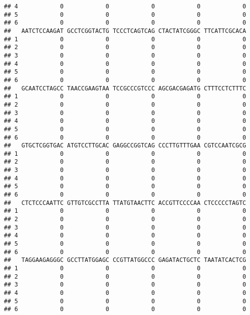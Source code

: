\documentclass[]{article}
\begin{document}
\begin{verbatim}
## 4            0            0            0            0            0
## 5            0            0            0            0            0
## 6            0            0            0            0            0
##   AATCTCCAAGAT GCCTCGGTACTG TCCCTCAGTCAG CTACTATCGGGC TTCATTCGCACA
## 1            0            0            0            0            0
## 2            0            0            0            0            0
## 3            0            0            0            0            0
## 4            0            0            0            0            0
## 5            0            0            0            0            0
## 6            0            0            0            0            0
##   GCAATCCTAGCC TAACCGAAGTAA TCCGCCCGTCCC AGCGACGAGATG CTTTCCTCTTTC
## 1            0            0            0            0            0
## 2            0            0            0            0            0
## 3            0            0            0            0            0
## 4            0            0            0            0            0
## 5            0            0            0            0            0
## 6            0            0            0            0            0
##   GTGCTCGGTGAC ATGTCCTTGCAC GAGGCCGGTCAG CCCTTGTTTGAA CGTCCAATCGCG
## 1            0            0            0            0            0
## 2            0            0            0            0            0
## 3            0            0            0            0            0
## 4            0            0            0            0            0
## 5            0            0            0            0            0
## 6            0            0            0            0            0
##   CTCTCCCAATTC GTTGTCGCCTTA TTATGTAACTTC ACCGTTCCCCAA CTCCCCCTAGTC
## 1            0            0            0            0            0
## 2            0            0            0            0            0
## 3            0            0            0            0            0
## 4            0            0            0            0            0
## 5            0            0            0            0            0
## 6            0            0            0            0            0
##   TAGGAAGAGGGC GCCTTATGGAGC CCGTTATGGCCC GAGATACTGCTC TAATATCACTCG
## 1            0            0            0            0            0
## 2            0            0            0            0            0
## 3            0            0            0            0            0
## 4            0            0            0            0            0
## 5            0            0            0            0            0
## 6            0            0            0            0            0

\end{verbatim}
\end{document}
